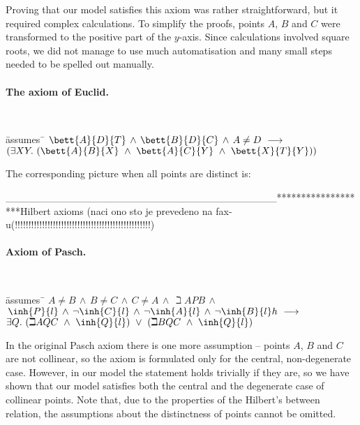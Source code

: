 Proving that our model satisfies this axiom was rather
straightforward, but it required complex calculations. To simplify the
proofs, points $A$, $B$ and $C$ were transformed to the positive part
of the $y$-axis. Since calculations involved square roots, we did not
manage to use much automatisation and many small steps needed to be
spelled out manually.

\paragraph{The axiom of Euclid.}
{\tt
\begin{tabbing}
\hspace{5mm}\=assumes\ \=\kill
$\bett{A}{D}{T} \,\wedge\, \bett{B}{D}{C} \,\wedge\, A \neq D \ \longrightarrow\ $\\
\>$(\exists X Y.\ (\bett{A}{B}{X}\ \wedge\ \bett{A}{C}{Y}\ \wedge\ \bett{X}{T}{Y}))$
\end{tabbing}
}

The corresponding picture when all points are distinct is:

\begin{center}

\end{center}


_____________________________________*******************Hilbert axioms (naci ono sto je prevedeno na fax-u(!!!!!!!!!!!!!!!!!!!!!!!!!!!!!!!!!!!!!!!!!!!!!!!!!!)

\paragraph{Axiom of Pasch.}

{\tt
\begin{tabbing}
\hspace{5mm}\=assumes\ \=\kill
$A \neq B\,\wedge\,B \neq C\,\wedge\,C \neq A\,\wedge\,\beth{A}{P}{B}\,\wedge$\\
$\,\inh{P}{l}\,\wedge\,\neg \inh{C}{l}\,\wedge\,\neg \inh{A}{l}\,\wedge\,\neg \inh{B}{l}h\ \longrightarrow$\\
\>$\exists Q.\ (\beth{A}{Q}{C}\  \wedge\ \inh{Q}{l})\ \vee\
               (\beth{B}{Q}{C}\  \wedge\  \inh{Q}{l})$
\end{tabbing}
}

\begin{center}

\end{center}

In the original Pasch axiom there is one more assumption -- points $A$,
$B$ and $C$ are not collinear, so the axiom is formulated only for the
central, non-degenerate case. However, in our model the statement
holds trivially if they are, so we have shown that our model satisfies
both the central and the degenerate case of collinear points. Note
that, due to the properties of the Hilbert's between relation, the
assumptions about the distinctness of points cannot be omitted.

